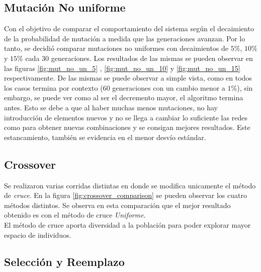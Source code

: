 \documentclass{sig-alternate}
\begin{document}
		\subsection{Mutación No uniforme}
		
		Con el objetivo de comparar el comportamiento del sistema según el decaimiento de la probabilidad de mutación a medida que las generaciones avanzan. Por lo tanto, se decidió comparar mutaciones no uniformes con decaimientos de $5\%$, $10\%$ y $15\%$ cada 30 generaciones. Los resultados de las mismas se pueden observar en las figuras \ref{fig:mut_no_un_5} , \ref{fig:mut_no_un_10} y \ref{fig:mut_no_un_15} respectivamente. De las mismas se puede observar a simple vista, como en todos los casos termina por contexto (60 generaciones con un cambio menor a $1\%$), sin embargo, se puede ver como al ser el decremento mayor, el algoritmo termina antes. Esto se debe a que al haber muchas menos mutaciones, no hay introducción de elementos nuevos y no se llega a cambiar lo suficiente las redes como para obtener nuevas combinaciones y se consigan mejores resultados. Este estancamiento, también se evidencia en el menor desvío estándar.

		\subsection{Crossover}

		Se realizaron varias corridas distintas en donde se modifica unicamente el método de \textit{cruce}. En la figura \ref{fig:crossover_comparison} se pueden observar los cuatro métodos distintos. Se observa en esta comparación que el mejor resultado obtenido es con el método de cruce \textit{Uniforme}.\\
		El método de cruce aporta diversidad a la población para poder explorar mayor espacio de individuos.

		\subsection{Selección y Reemplazo}
\end{document}
